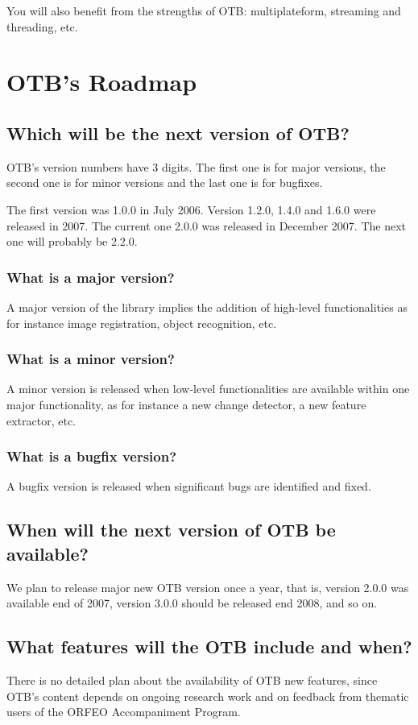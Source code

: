 You will also benefit from the strengths of OTB: multiplateform, streaming and 
threading, etc.

\section{OTB's Roadmap}
\subsection{Which will be the next version of OTB?}
OTB's version numbers have 3 digits. The first one is for major
versions, the second one is for minor versions and the last one is for
bugfixes.

The first version was 1.0.0 in July 2006. Version 1.2.0, 1.4.0 and 1.6.0 were released in 2007. 
The current one 2.0.0 was released in December 2007. The next one will probably be 2.2.0.

\subsubsection{What is a major version?}
A major version of the library implies the addition of high-level
functionalities as for instance image registration, object recognition, etc.

\subsubsection{What is a minor version?}
A minor version is released when low-level functionalities are
available within one major functionality, as for instance a new
change detector, a new feature extractor, etc.

\subsubsection{What is a bugfix version?}
A bugfix version is released when significant bugs are identified and fixed.

\subsection{When will the next version of OTB be available?}
We plan to release major new OTB version once a year, that is, version
2.0.0 was available end of 2007, version 3.0.0 should be released
end 2008, and so on.

\subsection{What features will the OTB include and when?}
There is no detailed plan about the availability of OTB new features,
since OTB's content depends on ongoing research work and on feedback
from thematic users of the ORFEO Accompaniment Program.


